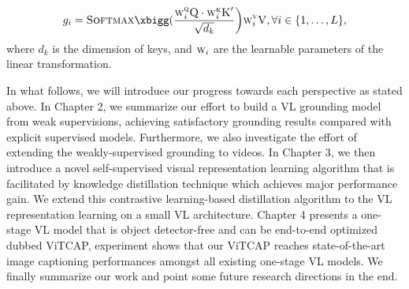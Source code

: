 \begin{equation}
{g_i} = \textsc{Softmax}\xbigg(\frac{\textsc{w}^\textsc{q}_i \textsc{Q}\cdot \textsc{w}^\textsc{k}_i \textsc{K}^\prime}{\sqrt{d_k}}\bigg)\textsc{w}^\textsc{v}_i \textsc{V}, \forall i \in \{1, \dots, L \},
\end{equation}
where $d_k$ is the dimension of keys, and $\textsc{w}_i$ are the learnable parameters of the linear transformation.



In what follows, we will introduce our progress towards each perspective as stated above. In Chapter 2, we summarize our effort to build a VL grounding model from weak supervisions, achieving satisfactory grounding results compared with explicit supervised models. Furthermore, we also investigate the effort of extending the weakly-supervised grounding to videos. In Chapter 3, we then introduce a novel self-supervised visual representation learning algorithm that is facilitated by knowledge distillation technique which achieves major performance gain. We extend this contrastive learning-based distillation algorithm to the VL representation learning on a small VL architecture. Chapter 4 presents a one-stage VL model that is object detector-free and can be end-to-end optimized dubbed ViTCAP, experiment shows that our ViTCAP reaches state-of-the-art image captioning performances amongst all existing one-stage VL models. We finally summarize our work and point some future research directions in the end.